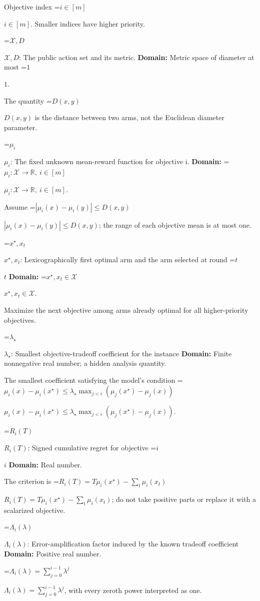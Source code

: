 \documentclass[10pt,a4paper]{article}
\newcommand{\AtlasMath}[1]{\par\begingroup\centering\setbox0=\hbox{$\displaystyle #1$}\ifdim\wd0>1.4\linewidth\typeout{ATLAS WIDE FORMULA: \the\wd0}\fi\ifdim\wd0>\linewidth\resizebox{\linewidth}{!}{\box0}\else\box0\fi\par\endgroup}
\newcommand{\AtlasInlineMath}[1]{\begingroup\setbox0=\hbox{$#1$}\ifdim\wd0>.4\linewidth\endgroup\AtlasMath{#1}\else\endgroup$#1$\fi}
\begin{document}
Objective index \AtlasInlineMath{i\in[m]}. Smaller indices have higher priority.



\AtlasInlineMath{\mathcal X,D}: The public action set and its metric. \textbf{Domain:} Metric space of diameter at most \AtlasInlineMath{1}.



The quantity \AtlasInlineMath{D(x,y)} is the distance between two arms, not the Euclidean diameter parameter.



\AtlasInlineMath{\mu_i}: The fixed unknown mean-reward function for objective i. \textbf{Domain:} \AtlasInlineMath{\mu_i:\mathcal X\to\mathbb R,\ i\in[m]}.



Assume \AtlasInlineMath{|\mu_i(x)-\mu_i(y)|\le D(x,y)}; the range of each objective mean is at most one.



\AtlasInlineMath{x^\star,x_t}: Lexicographically first optimal arm and the arm selected at round \AtlasInlineMath{t} \textbf{Domain:} \AtlasInlineMath{x^\star,x_t\in\mathcal X}.



Maximize the next objective among arms already optimal for all higher-priority objectives.



\AtlasInlineMath{\lambda_\star}: Smallest objective-tradeoff coefficient for the instance \textbf{Domain:} Finite nonnegative real number; a hidden analysis quantity.



The smallest coefficient satisfying the model's condition \AtlasInlineMath{\mu_i(x)-\mu_i(x^\star)\le\lambda_\star\max_{j<i}(\mu_j(x^\star)-\mu_j(x))}.



\AtlasInlineMath{R_i(T)}: Signed cumulative regret for objective \AtlasInlineMath{i} \textbf{Domain:} Real number.



The criterion is \AtlasInlineMath{R_i(T)=T\mu_i(x^\star)-\sum_t\mu_i(x_t)}; do not take positive parts or replace it with a scalarized objective.



\AtlasInlineMath{\Lambda_i(\lambda)}: Error-amplification factor induced by the known tradeoff coefficient \textbf{Domain:} Positive real number.



\AtlasInlineMath{\Lambda_i(\lambda)=\sum_{j=0}^{i-1}\lambda^j}, with every zeroth power interpreted as one.
\end{document}
